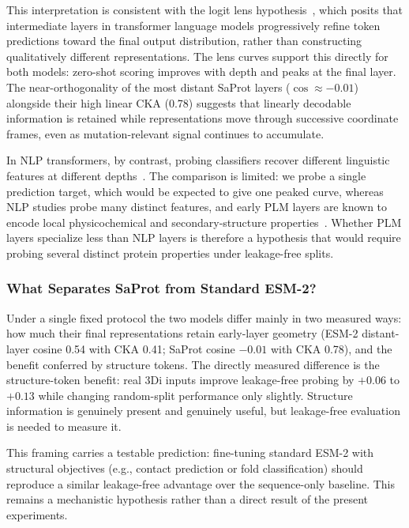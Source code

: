 \documentclass[11pt,a4paper]{article}
\newcommand{\revised}[1]{#1}
\newcommand{\rtwo}[1]{#1}
\newcommand{\rthree}[1]{#1}
\begin{document}
This interpretation is consistent with the logit lens
hypothesis~\cite{nostalgebraist2020,belrose2023eliciting},
which posits that intermediate layers in transformer language models progressively
refine token predictions toward the final output distribution, rather than
constructing qualitatively different representations. \revised{The lens
curves support this directly for both models: zero-shot scoring improves with depth
and peaks at the final layer.} The near-orthogonality of the most distant SaProt
layers ($\cos \approx -0.01$) \revised{alongside their high linear CKA (\rthree{0.78})}
\rtwo{suggests that linearly decodable information is retained while representations
move through successive coordinate frames, even as mutation-relevant signal continues
to accumulate.}

\rthree{In NLP transformers, by contrast, probing classifiers recover different
linguistic features at different depths~\cite{tenney2019bert,rogers2021bertology}. The
comparison is limited: we probe a single prediction target, which would be expected to
give one peaked curve, whereas NLP studies probe many distinct features, and early PLM
layers are known to encode local physicochemical and secondary-structure
properties~\cite{detlefsen2022}. Whether PLM layers specialize less than NLP layers is
therefore a hypothesis that would require probing several distinct protein properties
under leakage-free splits.}

\subsubsection{\revised{What Separates SaProt from Standard ESM-2?}}

\revised{Under \rtwo{a single fixed} protocol the two models differ mainly in two measured
ways: how much their final representations retain early-layer geometry (ESM-2
distant-layer cosine \rthree{0.54 with CKA 0.41}; SaProt cosine $-0.01$ with CKA \rthree{0.78}), and the benefit conferred by structure tokens. The directly measured
difference is the structure-token benefit: real 3Di inputs improve leakage-free
probing by \rthree{$+0.06$ to $+0.13$} while \rtwo{changing random-split performance only
slightly}. Structure information is genuinely present and genuinely useful, but
\rtwo{leakage-free evaluation is needed to measure it}.}

\revised{This framing carries a testable prediction: fine-tuning standard ESM-2
with structural objectives (e.g., contact prediction or fold classification)
should reproduce a similar leakage-free advantage over the sequence-only baseline.
This remains a mechanistic hypothesis rather than a direct result of the present
experiments.}
\end{document}
